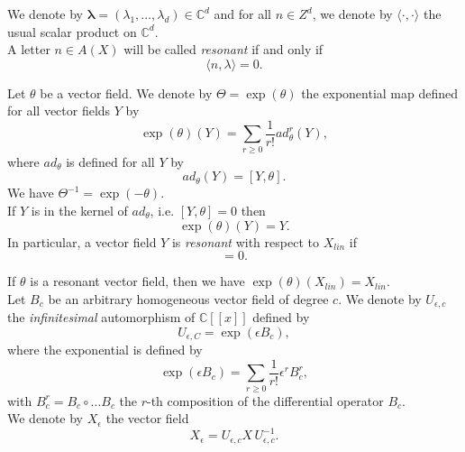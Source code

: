\documentclass[english,11pt]{amsart}
\def\blambda{\mathbf{\lambda}}
\def\C{\mathbb{C}}
\def\di{\displaystyle}
\begin{document}
We denote by $\blambda = (\lambda_ 1, \dots ,\lambda_d ) \in \C^d$ and for all $n\in Z^d$, we denote by $\langle \cdot ,\cdot \rangle$ the usual scalar product on $\C^d$. \\

A letter $n\in A(X)$ will be called {\it resonant} if and only if 
\begin{equation}
\langle n,\lambda \rangle =0.
\end{equation}

Let $\theta$ be a vector field. We denote by $\Theta =\exp (\theta )$ the exponential map defined for all vector fields $Y$ by 
\begin{equation}
    \exp (\theta ) (Y) =\di\sum_{r\geq 0} \di\frac{1}{r!} \di ad^r_{\theta} (Y ),
\end{equation}
where $ad_{\theta}$ is defined for all $Y$ by 
\begin{equation}
    ad_{\theta} (Y)=[Y,\theta ] .
\end{equation}
We have $\Theta^{-1} =\exp (-\theta )$.\\

If $Y$ is in the kernel of $ad_{\theta}$, i.e. $[Y,\theta ]=0$ then 
\begin{equation}
    \exp (\theta ) (Y)=Y .
\end{equation}
In particular, a vector field $Y$ is {\it resonant} with respect to $X_{lin}$ if 
\begin{equation}
[Y,X_{lin}] =0 .
\end{equation}

If $\theta$ is a resonant vector field, then we have $\exp (\theta ) (X_{lin} ) =X_{lin}$.\\

Let $B_c$ be an arbitrary homogeneous vector field of degree $c$. We denote by $U_{\epsilon,c}$ the {\it infinitesimal} automorphism of $\C [[ x ]]$ defined by 
\begin{equation}
    U_{\epsilon ,C} =\exp (\epsilon B_c ) ,
\end{equation}
where the exponential is defined by 
\begin{equation}
    \exp (\epsilon B_c )=\di\sum_{r\geq 0} \di\frac{1}{r!} \epsilon^r B_c^r ,
\end{equation}
with $B_c^r =B_c \circ \dots B_c$ the $r$-th composition of the differential operator $B_c$. \\

We denote by $X_{\epsilon}$ the vector field 
\begin{equation}
    X_{\epsilon} =U_{\epsilon ,c } X\, U_{\epsilon ,c}^{-1} .
\end{equation}
\end{document}
